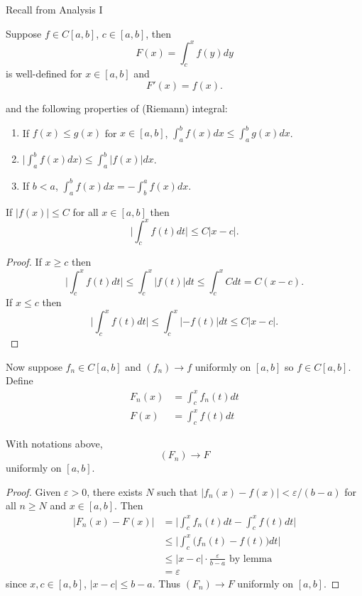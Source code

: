 \documentclass[a4paper]{article}
\theoremstyle{definition}
\begin{document}
Recall from Analysis I
\begin{thm}
  \label{thm:FTC}
  Suppose \(f\in C[a,b]\), \(c\in [a,b]\), then
  \[
    F(x) = \int_{c}^{x} f(y) dy
  \]
  is well-defined for \(x\in[a,b]\) and
  \[
    F'(x) = f(x).
  \]
\end{thm}
and the following properties of (Riemann) integral:
\begin{enumerate}
\item If \(f(x) \leq g(x) \) for \(x\in[a,b]\), \(\int_{a}^{b} f(x) dx \leq \int_{a}^{b} g(x) dx \).
\item \(\big|\int_{a}^{b} f(x) dx \big) \leq \int_{a}^{b} |f(x)| dx \).
\item If \(b<a\), \(\int_{a}^{b} f(x) dx = - \int_{b}^{a} f(x) dx \).
\end{enumerate}

\begin{lem}
  If \(|f(x)|\leq C\) for all \(x\in[a,b]\) then
  \[
    \Big| \int_{c}^{x} f(t) dt \Big| \leq C|x-c|.
  \]
\end{lem}

\begin{proof}
  If \(x\geq c\) then
  \[
    \Big| \int_{c}^{x} f(t) dt \Big| \leq \int_{c}^{x} |f(t)| dt \leq \int_{c}^{x} C dt = C(x-c).
  \]
  If \(x\leq c\) then
   \[
    \Big| \int_{c}^{x} f(t) dt \Big| \leq \int_{c}^{x} |-f(t)| dt \leq C|x-c|.
  \]
\end{proof}

Now suppose \(f_n\in C[a,b]\) and \((f_n)\to f\) uniformly on \([a,b]\) so \(f\in C[a,b]\). Define
\begin{align*}
  F_n(x) &= \int_{c}^{x} f_n(t) dt \\
  F(x) &= \int_{c}^{x} f(t) dt
\end{align*}

\begin{prop}
  \label{prop:power series integral convergence}
  With notations above,
  \[
    (F_n) \to F
  \]
  uniformly on \([a,b]\).
\end{prop}

\begin{proof}
  Given \(\varepsilon>0\), there exists \(N\) such that \(|f_n(x) - f(x)| < \varepsilon/(b-a)\) for all \(n\geq N\) and \(x\in[a,b]\). Then
  \begin{align*}
    |F_n(x) - F(x)| &= \Big| \int_{c}^{x} f_n(t) dt - \int_{c}^{x} f(t) dt \Big| \\
                    &\leq \Big| \int_{c}^{x} \big( f_n(t) - f(t) \big) dt \Big| \\
                    &\leq |x-c| \cdot\frac{\varepsilon}{b-a} \text{ by lemma} \\
                    &= \varepsilon
  \end{align*}
  since \(x,c\in[a,b]\), \(|x-c|\leq b-a\). Thus \((F_n)\to F\) uniformly on \([a,b]\).
\end{proof}
\end{document}
